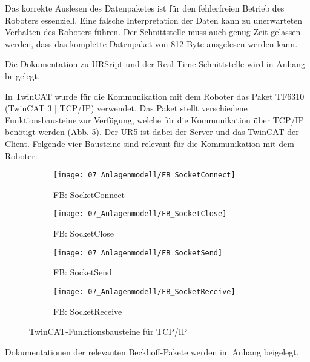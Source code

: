 		Das korrekte Auslesen des Datenpaketes ist für den fehlerfreien Betrieb des Roboters essenziell. Eine falsche Interpretation der Daten kann zu unerwarteten Verhalten des Roboters führen. Der Schnittstelle muss auch genug Zeit gelassen werden, dass das komplette Datenpaket von 812 Byte ausgelesen werden kann.
		
		\begin{bfhNoteBox}
			Die Dokumentation zu URSript und der Real-Time-Schnittstelle wird in Anhang beigelegt. 
		\end{bfhNoteBox}
		
		\newpage
		
		In TwinCAT wurde für die Kommunikation mit dem Roboter das Paket TF6310 (TwinCAT 3 | TCP/IP) verwendet. Das Paket stellt verschiedene Funktionsbausteine zur Verfügung, welche für die Kommunikation über TCP/IP benötigt werden (Abb. \ref{fig:TwinCAT-Funktionsbausteine}). Der UR5 ist dabei der Server und das TwinCAT der Client. Folgende vier Bausteine sind relevant für die Kommunikation mit dem Roboter:
		
		\begin{figure}[h!]
			\centering
			\begin{subfigure}[b]{0.45\textwidth}
				\centering
				\texttt{[image: 07\_Anlagenmodell/FB\_SocketConnect]}
				\caption{FB: SocketConnect}
				\label{fig:FB_SocketConnect}
			\end{subfigure}
			\hfill
			\begin{subfigure}[b]{0.45\textwidth}
				\centering
				\texttt{[image: 07\_Anlagenmodell/FB\_SocketClose]}
				\caption{FB: SocketClose}
				\label{fig:FB_SocketClose}
			\end{subfigure}
			\vfill
			\begin{subfigure}[b]{0.45\textwidth}
				\centering
				\texttt{[image: 07\_Anlagenmodell/FB\_SocketSend]}
				\caption{FB: SocketSend}
				\label{fig:FB_SocketSend}
			\end{subfigure}
			\hfill
			\begin{subfigure}[b]{0.45\textwidth}
				\centering
				\texttt{[image: 07\_Anlagenmodell/FB\_SocketReceive]}
				\caption{FB: SocketReceive}
				\label{fig:FB_SocketReceive}
			\end{subfigure}
			\caption{TwinCAT-Funktionsbausteine für TCP/IP}
			\label{fig:TwinCAT-Funktionsbausteine}
		\end{figure}
		
		\begin{bfhNoteBox}
			Dokumentationen der relevanten Beckhoff-Pakete werden im Anhang beigelegt.  
		\end{bfhNoteBox}
		\vspace{3mm}
		

